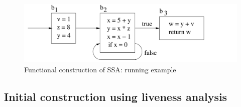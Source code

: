 \begin{figure}
\begin{center}
\includegraphics[scale=0.5]{SSAConstructionExample1}
\end{center}
\caption{\label{fig:FunctionalCorrespondenceRunningExampleGraphic} Functional construction of SSA: running example}
\end{figure}

\subsection{Initial construction using liveness analysis}
\label{section:Part1:Semantics:LivenessAnalysis}

